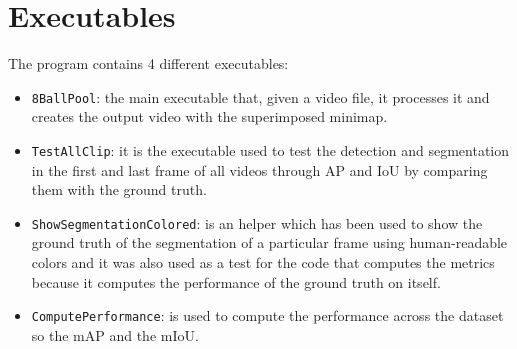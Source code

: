 \section{Executables}
The program contains 4 different executables:
\begin{itemize}
	\item \texttt{8BallPool}: the main executable that, given a video file, it processes it and creates the output video with the superimposed minimap.
	\item \texttt{TestAllClip}: it is the executable used to test the detection and segmentation in the first and last frame of all videos through AP and IoU by comparing them with the ground truth.
	\item \texttt{ShowSegmentationColored}: is an helper which has been used to show the ground truth of the segmentation of a particular frame using human-readable colors and it was also used as a test for the code that computes the metrics because it computes the performance of the ground truth on itself.
	\item \texttt{ComputePerformance}: is used to compute the performance across the dataset so the mAP and the mIoU.
\end{itemize}
